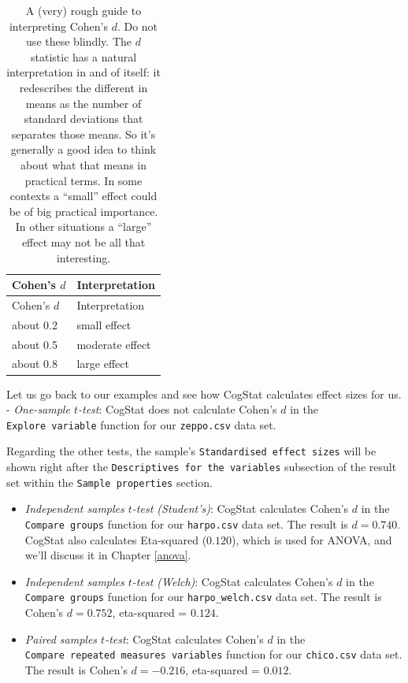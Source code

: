 \documentclass[
]{book}
\providecommand{\tightlist}{%
  \setlength{\itemsep}{0pt}\setlength{\parskip}{0pt}}
\theoremstyle{definition}
\theoremstyle{definition}
\theoremstyle{definition}
\theoremstyle{definition}
\theoremstyle{remark}
\begin{document}
\begin{longtable}[]{@{}ll@{}}
\caption{\label{tab:cohensdinterpretation}A (very) rough guide to interpreting Cohen's \(d\). Do not use these blindly. The \(d\) statistic has a natural interpretation in and of itself: it redescribes the different in means as the number of standard deviations that separates those means. So it's generally a good idea to think about what that means in practical terms. In some contexts a ``small'' effect could be of big practical importance. In other situations a ``large'' effect may not be all that interesting.}\tabularnewline
\toprule()
Cohen's \(d\) & Interpretation \\
\midrule()
\endfirsthead
\toprule()
Cohen's \(d\) & Interpretation \\
\midrule()
\endhead
about 0.2 & small effect \\
about 0.5 & moderate effect \\
about 0.8 & large effect \\
\bottomrule()
\end{longtable}

Let us go back to our examples and see how CogStat calculates effect sizes for us.
- \emph{One-sample \(t\)-test}: CogStat does not calculate Cohen's \(d\) in the \texttt{Explore\ variable} function for our \texttt{zeppo.csv} data set.

Regarding the other tests, the sample's \texttt{Standardised\ effect\ sizes} will be shown right after the \texttt{Descriptives\ for\ the\ variables} subsection of the result set within the \texttt{Sample\ properties} section.

\begin{itemize}
\tightlist
\item
  \emph{Independent samples \(t\)-test (Student's)}: CogStat calculates Cohen's \(d\) in the \texttt{Compare\ groups} function for our \texttt{harpo.csv} data set. The result is \(d=0.740\). CogStat also calculates Eta-squared (\(0.120\)), which is used for ANOVA, and we'll discuss it in Chapter \ref{anova}.
\item
  \emph{Independent samples \(t\)-test (Welch)}: CogStat calculates Cohen's \(d\) in the \texttt{Compare\ groups} function for our \texttt{harpo\_welch.csv} data set. The result is Cohen's \(d=0.752\), eta-squared = \(0.124\).
\item
  \emph{Paired samples \(t\)-test}: CogStat calculates Cohen's \(d\) in the \texttt{Compare\ repeated\ measures\ variables} function for our \texttt{chico.csv} data set. The result is Cohen's \(d=-0.216\), eta-squared = \(0.012\).
\end{itemize}
\end{document}
